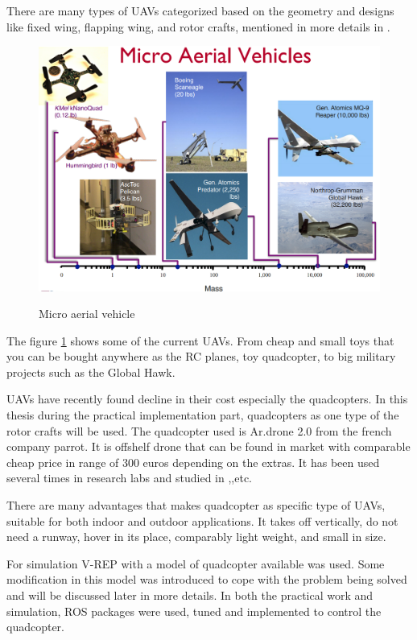 There are many types of UAVs categorized based on the geometry and designs like fixed wing, flapping wing, and rotor crafts, mentioned in more details in \cite{UAV_general}. 

\begin{figure}[!htb]
  \includegraphics[width=\linewidth]{figures/Micro_aerial.png}
  \caption{Micro aerial vehicle}\label{fig:micro_aerial} \cite{Ardrone2}
  \endminipage\hfill
\end{figure}

The figure \ref{fig:micro_aerial}  shows some of the current UAVs. From cheap and small toys that you can be bought anywhere as the RC planes, toy quadcopter, to big military projects such as the Global Hawk. 

UAVs have recently found decline in their cost especially the quadcopters. In this thesis during the practical implementation part, quadcopters as one type of the rotor crafts will be used. The quadcopter used is Ar.drone 2.0 from the french company parrot. It is offshelf drone that can be found in market with comparable cheap price in range of 300 euros depending on the extras. It has been used several times in research labs and studied in \cite{Ardrone1},\cite{Ardrone2},etc.

There are many advantages that makes quadcopter as specific type of UAVs, suitable for both indoor and outdoor applications. It takes off vertically, do not need a runway, hover in its place, comparably light weight, and small in size.

For simulation V-REP with a model of quadcopter available was used. Some modification in this model was introduced to cope with the problem being solved and will be discussed later in more details. In both the practical work and simulation, ROS packages were used, tuned and implemented to control the quadcopter.

